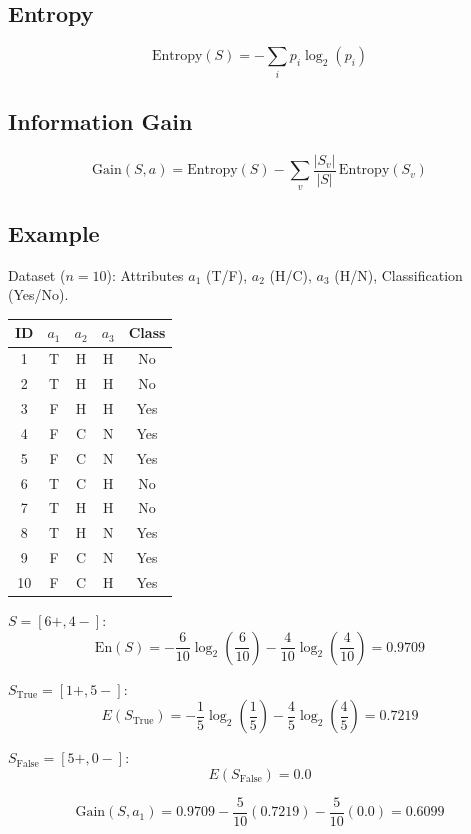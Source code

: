 \documentclass[12pt,a4paper]{article}
\begin{document}
\subsection{Entropy}

\[
\text{Entropy}(S) = -\sum_i p_i \log_2(p_i)
\]

\subsection{Information Gain}

\[
\text{Gain}(S, a) = \text{Entropy}(S) - \sum_v \frac{|S_v|}{|S|}\,\text{Entropy}(S_v)
\]

\subsection{Example}

\begin{examplebox}
Dataset ($n=10$): Attributes $a_1$ (T/F), $a_2$ (H/C), $a_3$ (H/N), Classification (Yes/No).

\begin{center}
\begin{tabular}{ccccc}
\toprule
ID & $a_1$ & $a_2$ & $a_3$ & Class \\
\midrule
1 & T & H & H & No \\
2 & T & H & H & No \\
3 & F & H & H & Yes \\
4 & F & C & N & Yes \\
5 & F & C & N & Yes \\
6 & T & C & H & No \\
7 & T & H & H & No \\
8 & T & H & N & Yes \\
9 & F & C & N & Yes \\
10 & F & C & H & Yes \\
\bottomrule
\end{tabular}
\end{center}

$S = [6+, 4-]$:
\[
\text{En}(S) = -\frac{6}{10}\log_2\!\left(\frac{6}{10}\right) - \frac{4}{10}\log_2\!\left(\frac{4}{10}\right) = 0.9709
\]

$S_\text{True} = [1+, 5-]$:
\[
E(S_\text{True}) = -\frac{1}{5}\log_2\!\left(\frac{1}{5}\right) - \frac{4}{5}\log_2\!\left(\frac{4}{5}\right) = 0.7219
\]

$S_\text{False} = [5+, 0-]$:
\[
E(S_\text{False}) = 0.0
\]

\[
\text{Gain}(S, a_1) = 0.9709 - \frac{5}{10}(0.7219) - \frac{5}{10}(0.0) = 0.6099
\]
\end{examplebox}
\end{document}
